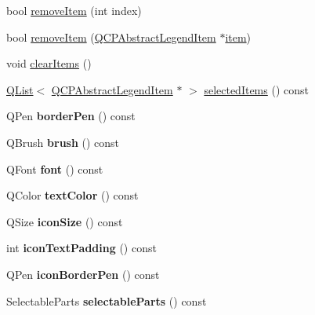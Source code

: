 \begin{DoxyCompactItemize}
\item 
bool \hyperlink{class_q_c_p_legend_ac91595c3eaa746fe6321d2eb952c63bb}{remove\+Item} (int index)
\item 
bool \hyperlink{class_q_c_p_legend_a2aea4ec6da2d454dd0b241a254d65082}{remove\+Item} (\hyperlink{class_q_c_p_abstract_legend_item}{Q\+C\+P\+Abstract\+Legend\+Item} $\ast$\hyperlink{class_q_c_p_legend_acfe9694c45104a3359d3806ed366fcf7}{item})
\item 
void \hyperlink{class_q_c_p_legend_a24795c7250eb5214fcea16b7217b4dfb}{clear\+Items} ()
\item 
\hyperlink{class_q_list}{Q\+List}$<$ \hyperlink{class_q_c_p_abstract_legend_item}{Q\+C\+P\+Abstract\+Legend\+Item} $\ast$ $>$ \hyperlink{class_q_c_p_legend_ac7d9e567d5c551e09cd9bcc4306c5532}{selected\+Items} () const
\item 
\mbox{\label{class_q_c_p_legend_a844b709a5632313416655f931c8e5631}} 
Q\+Pen {\bfseries border\+Pen} () const
\item 
\mbox{\label{class_q_c_p_legend_aaddafd5cbe9175512311350bb3b563e6}} 
Q\+Brush {\bfseries brush} () const
\item 
\mbox{\label{class_q_c_p_legend_ae240104de3c3a4cfc0834dbaffa07ac9}} 
Q\+Font {\bfseries font} () const
\item 
\mbox{\label{class_q_c_p_legend_aa96d8f1a183ec2be8c0461c0abebd6db}} 
Q\+Color {\bfseries text\+Color} () const
\item 
\mbox{\label{class_q_c_p_legend_ae4f17a186558c82d2ba269f6e7164dda}} 
Q\+Size {\bfseries icon\+Size} () const
\item 
\mbox{\label{class_q_c_p_legend_a19668bb7f8fafe20d367cebf96269eaf}} 
int {\bfseries icon\+Text\+Padding} () const
\item 
\mbox{\label{class_q_c_p_legend_a5b91d2ea68a4dd20238f660b80cd9945}} 
Q\+Pen {\bfseries icon\+Border\+Pen} () const
\item 
\mbox{\label{class_q_c_p_legend_ad091ff5e11edbe0adecba81c35522ac7}} 
Selectable\+Parts {\bfseries selectable\+Parts} () const

\end{DoxyCompactItemize}
